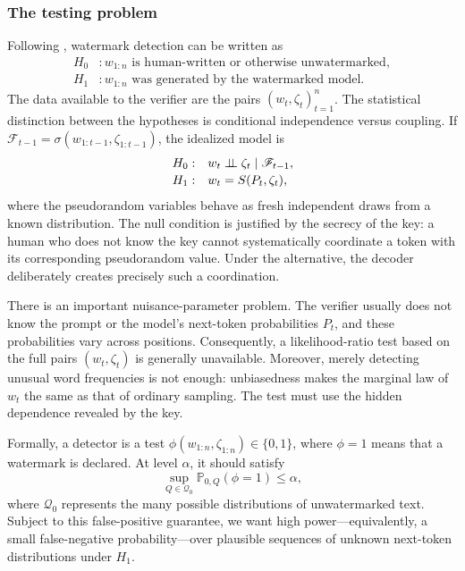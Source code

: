 \subsubsection{The testing problem}
Following \cite{li2024statistical}, watermark detection can be written as
\[
\begin{aligned}
    H_0 &: w_{1:n}\text{ is human-written or otherwise unwatermarked},\\
    H_1 &: w_{1:n}\text{ was generated by the watermarked model}.
\end{aligned}
\]
The data available to the verifier are the pairs $(w_t,\zeta_t)_{t=1}^n$. The
statistical distinction between the hypotheses is conditional independence versus
coupling. If $\mathcal{F}_{t-1}=\sigma(w_{1:t-1},\zeta_{1:t-1})$, the idealized
model is
\[
\begin{array}{ll}
H_0: & w_t\perp\!\!\!\perp \zeta_t\mid\mathcal{F}_{t-1},\\[2pt]
H_1: & w_t=S(P_t,\zeta_t),
\end{array}
\]
where the pseudorandom variables behave as fresh independent draws from a known
distribution. The null condition is justified by the secrecy of the key: a human
who does not know the key cannot systematically coordinate a token with its
corresponding pseudorandom value. Under the alternative, the decoder deliberately
creates precisely such a coordination.

There is an important nuisance-parameter problem. The verifier usually does not
know the prompt or the model's next-token probabilities $P_t$, and these
probabilities vary across positions. Consequently, a likelihood-ratio test based
on the full pairs $(w_t,\zeta_t)$ is generally unavailable. Moreover, merely
detecting unusual word frequencies is not enough: unbiasedness makes the marginal
law of $w_t$ the same as that of ordinary sampling. The test must use the hidden
dependence revealed by the key.

Formally, a detector is a test $\phi(w_{1:n},\zeta_{1:n})\in\{0,1\}$, where
$\phi=1$ means that a watermark is declared. At level $\alpha$, it should satisfy
\[
    \sup_{Q\in\mathcal{Q}_0}\mathbb{P}_{0,Q}(\phi=1)\leq \alpha,
\]
where $\mathcal{Q}_0$ represents the many possible distributions of unwatermarked
text. Subject to this false-positive guarantee, we want high power---equivalently,
a small false-negative probability---over plausible sequences of unknown
next-token distributions under $H_1$.

